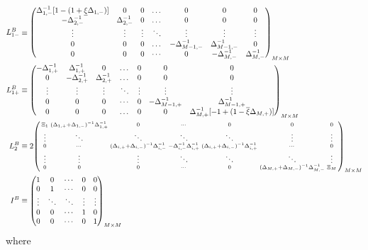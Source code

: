 \documentclass[11pt]{article}
\newenvironment{psmallmatrix}
{\left(\begin{smallmatrix}}
	{\end{smallmatrix}\right)}
\theoremstyle{definition}
\begin{document}
\begin{align}
L_{1-}^B &\equiv \begin{pmatrix}
\Delta^{-1}_{1,-} [1 - (1 + \underline{\xi} \Delta_{1,-})] &0&0&\dots&0&0&0\\
-\Delta_{2,-}^{-1}&\Delta_{2,-}^{-1}&0&\dots&0&0&0\\
\vdots&\vdots&\vdots&\ddots&\vdots&\vdots&\vdots\\
0&0&0&\dots&-\Delta_{M-1,-}^{-1}&\Delta_{M-1,-}^{-1}&0\\
0&0&0&\cdots&0&-\Delta_{M,-}^{-1}&\Delta_{M,-}^{-1}
\end{pmatrix}_{M\times M}\label{eq:L-1} \\
L_{1+}^B &\equiv \begin{pmatrix}
-\Delta_{1,+}^{-1}&\Delta_{1,+}^{-1}&0&\dots&0&0&0\\
0&-\Delta_{2,+}^{-1}&\Delta_{2,+}^{-1}&\dots&0&0&0\\
\vdots&\vdots&\vdots&\ddots&\vdots&\vdots&\vdots\\
0&0&0&\cdots&0&-\Delta_{M-1,+}^{-1}&\Delta_{M-1,+}^{-1}\\
0&0&0&\dots&0&0&\Delta_{M,+}^{-1}  [-1 + (1 - \overline{\xi} \Delta_{M,+})]  \\
\end{pmatrix}_{M\times M}\label{eq:L-1-plus} \\
L_2^B &\equiv 2 \begin{psmallmatrix}
\Xi_1 &
(\Delta_{1,+}+\Delta_{1,-})^{-1} \Delta_{1,+}^{-1}
&0&\cdots&0&0&0 \\
\vdots&\ddots&\ddots&\ddots&\ddots&\vdots&\vdots\\
0&\cdots&
(\Delta_{i,+}+\Delta_{i,-})^{-1} \Delta_{i,-}^{-1} &
-\Delta_{i,-}^{-1} \Delta_{i,+}^{-1}  &
 (\Delta_{i,+}+\Delta_{i,-})^{-1} \Delta_{i,+}^{-1}&\cdots&0 \\
\vdots&\vdots&\vdots&\ddots&\ddots&\ddots&\vdots\\
0&0&0&\cdots&0&(\Delta_{M,+}+\Delta_{M,-})^{-1} \Delta_{M,-}^{-1}&\Xi_M
\end{psmallmatrix}_{M\times M}\label{eq:L-2} \\
I^B &\equiv \begin{pmatrix}
1 & 0 & \cdots & 0 & 0 \\
0 & 1 & \cdots & 0 & 0 \\
\vdots  & \ddots & \ddots &  \vdots  & \vdots   \\
0 & 0 & \cdots & 1 & 0 \\
0 & 0 & \cdots & 0 & 1
\end{pmatrix}_{M\times M}
\end{align}
where
\end{document}
